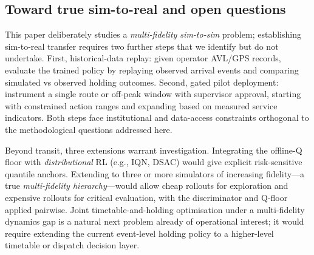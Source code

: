 \subsection{Toward true sim-to-real and open questions}

This paper deliberately studies a \emph{multi-fidelity sim-to-sim} problem; establishing sim-to-real transfer requires two further steps that we identify but do not undertake.
First, historical-data replay: given operator AVL/GPS records, evaluate the trained policy by replaying observed arrival events and comparing simulated vs observed holding outcomes.
Second, gated pilot deployment: instrument a single route or off-peak window with supervisor approval, starting with constrained action ranges and expanding based on measured service indicators.
Both steps face institutional and data-access constraints orthogonal to the methodological questions addressed here.

Beyond transit, three extensions warrant investigation.
Integrating the offline-Q floor with \emph{distributional} RL (e.g., IQN, DSAC) would give explicit risk-sensitive quantile anchors.
Extending to three or more simulators of increasing fidelity---a true \emph{multi-fidelity hierarchy}---would allow cheap rollouts for exploration and expensive rollouts for critical evaluation, with the discriminator and Q-floor applied pairwise.
Joint timetable-and-holding optimisation under a multi-fidelity dynamics gap is a natural next problem already of operational interest; it would require extending the current event-level holding policy to a higher-level timetable or dispatch decision layer.
